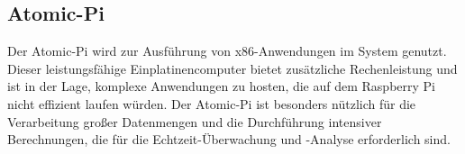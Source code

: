 \subsection{Atomic-Pi}
Der Atomic-Pi wird zur Ausführung von x86-Anwendungen im System genutzt. Dieser leistungsfähige Einplatinencomputer bietet zusätzliche Rechenleistung und ist in der Lage, komplexe Anwendungen zu hosten, die auf dem Raspberry Pi nicht effizient laufen würden. Der Atomic-Pi ist besonders nützlich für die Verarbeitung großer Datenmengen und die Durchführung intensiver Berechnungen, die für die Echtzeit-Überwachung und -Analyse erforderlich sind.


